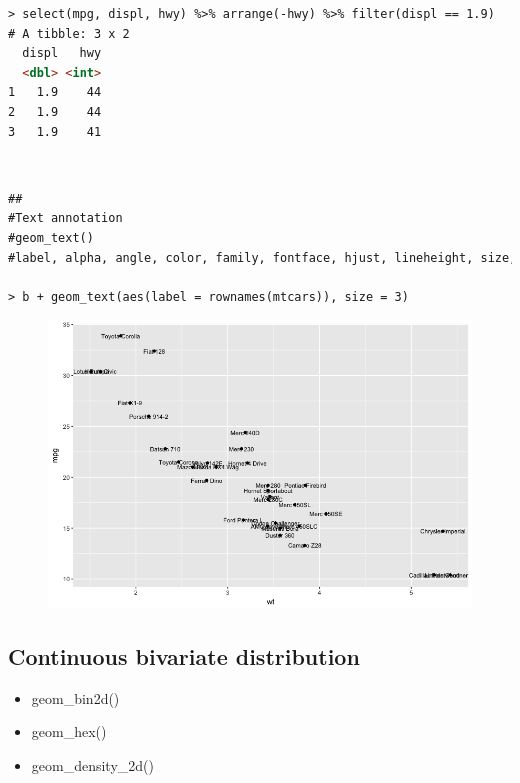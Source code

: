 \begin{lstlisting}[language=html]
> select(mpg, displ, hwy) %>% arrange(-hwy) %>% filter(displ == 1.9)
# A tibble: 3 x 2
  displ   hwy
  <dbl> <int>
1   1.9    44
2   1.9    44
3   1.9    41
\end{lstlisting}
\textcolor{white}{.}\newline
\begin{lstlisting}[language=html]
##
#Text annotation
#geom_text()
#label, alpha, angle, color, family, fontface, hjust, lineheight, size, vjust

> b + geom_text(aes(label = rownames(mtcars)), size = 3)
\end{lstlisting}
\begin{figure}[H]\begin{center}\includegraphics[scale=1 ]{ilu/bg55.png}\end{center}\end{figure}

\subsection{Continuous bivariate distribution}
\begin{itemize}
  \item geom\_bin2d()
  \item geom\_hex()
  \item geom\_density\_2d()
\end{itemize}

